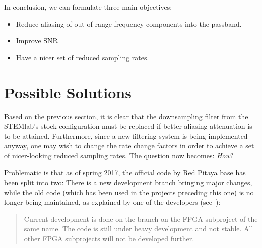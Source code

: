 In conclusion, we can formulate three main objectives:
\begin{itemize}\tightlist
    \item
        Reduce  aliasing   of  out-of-range  frequency  components   into  the
        passband.
    \item
        Improve SNR
    \item
        Have a nicer set of reduced sampling rates.
\end{itemize}

%
%
\section{Possible Solutions} %
\label{sec:mission:possible_solutions}

Based on the  previous section, it is clear that  the downsampling filter from
the  STEMlab's  stock  configuration  must  be  replaced  if  better  aliasing
attenuation is  to be attained. Furthermore,  since a new filtering  system is
being implemented  anyway, one may wish  to change the rate  change factors in
order to achieve  a set of nicer-looking reduced  sampling rates. The question
now becomes: \emph{How}?

Problematic is that  as of spring 2017,  the official code by  Red Pitaya base
has been  split into  two: There is  a new  development branch  bringing major
changes, while  the old code  (which has been  used in the  projects preceding
this one) is no longer being maintained, as explained by one of the developers
(see~\cite{pita:github:issue:huesser:jeras}):
\begin{quote}
    Current  development  is done  on  the   branch  on  the
    FPGA  subproject of  the same  name.  The  code is  still under  heavy
    development and  not stable. All  other FPGA  subprojects will  not be
    developed further.
\end{quote}

